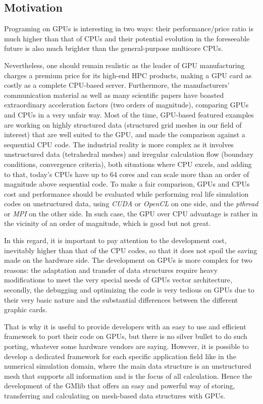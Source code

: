 \documentclass[a4paper,12pt]{article}
\begin{document}
\subsection{Motivation}

Programing on GPUs is interesting in two ways: their performance/price ratio is much higher than that of CPUs and their potential evolution in the foreseeable future is also much brighter than the general-purpose multicore CPUs.

Nevertheless, one should remain realistic as the leader of GPU manufacturing charges a premium price for its high-end HPC products, making a GPU card as costly as a complete CPU-based server. Furthermore, the manufacturers' communication material as well as many scientific papers have boasted extraordinary acceleration factors (two orders of magnitude), comparing GPUs and CPUs in a very unfair way. Most of the time, GPU-based featured examples are working on highly structured data (structured grid meshes in our field of interest) that are well suited to the GPU, and made the comparison against a sequential CPU code. The industrial reality is more complex as it involves unstructured data (tetrahedral meshes) and irregular calculation flow (boundary conditions, convergence criteria), both situations where CPU excels, and adding to that, today's CPUs have up to 64 cores and can scale more than an order of magnitude above sequential code. To make a fair comparison, GPUs and CPUs cost and performance should be evaluated while performing real life simulation codes on unstructured data, using \emph{CUDA} or \emph{OpenCL} on one side, and the \emph{pthread} or \emph{MPI} on the other side. In such case, the GPU over CPU advantage is rather in the vicinity of an order of magnitude, which is good but not great.

In this regard, it is important to pay attention to the development cost, inevitably higher than that of the CPU codes, so that it does not spoil the saving made on the hardware side.
The development on GPUs is more complex for two reasons: the adaptation and transfer of data structures require heavy modifications to meet the very special needs of GPUs vector architecture, secondly, the debugging and optimizing the code is very tedious on GPUs due to their very basic nature and the substantial differences between the different graphic cards.

That is why it is useful to provide developers with an easy to use and efficient framework to port their code on GPUs, but there is no silver bullet to do such porting, whatever some hardware vendors are saying. However, it is possible to develop a dedicated framework for each specific application field like in the numerical simulation domain, where the main data structure is an unstructured mesh that supports all information and is the focus of all calculation. Hence the development of the GMlib that offers an easy and powerful way of storing, transferring and calculating on mesh-based data structures with GPUs.
\end{document}
